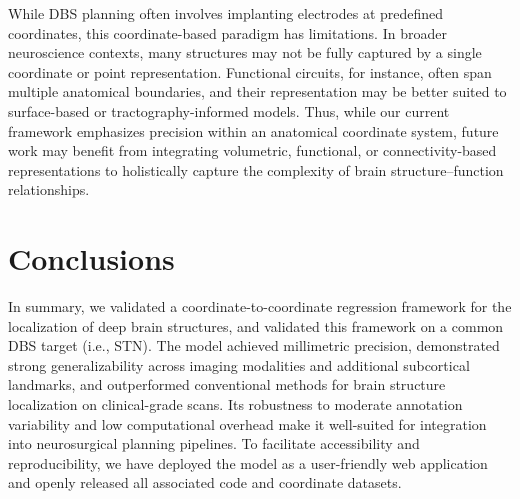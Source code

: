 While DBS planning often involves implanting electrodes at predefined coordinates, this coordinate-based paradigm has limitations. In broader neuroscience contexts, many structures may not be fully captured by a single coordinate or point representation. Functional circuits, for instance, often span multiple anatomical boundaries, and their representation may be better suited to surface-based or tractography-informed models. Thus, while our current framework emphasizes precision within an anatomical coordinate system, future work may benefit from integrating volumetric, functional, or connectivity-based representations to holistically capture the complexity of brain structure–function relationships.
\newline
\section{Conclusions}
In summary, we validated a coordinate-to-coordinate regression framework for the localization of deep brain structures, and validated this framework on a common DBS target (i.e., STN). The model achieved millimetric precision, demonstrated strong generalizability across imaging modalities and additional subcortical landmarks, and outperformed conventional methods for brain structure localization on clinical-grade scans. Its robustness to moderate annotation variability and low computational overhead make it well-suited for integration into neurosurgical planning pipelines. To facilitate accessibility and reproducibility, we have deployed the model as a user-friendly web application and openly released all associated code and coordinate datasets.

